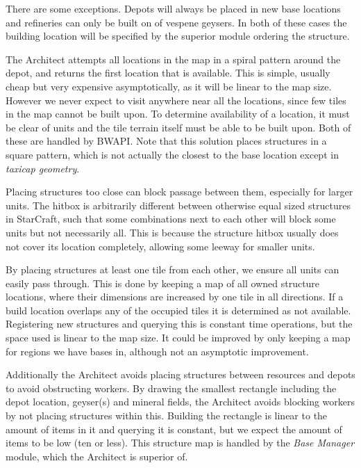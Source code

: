 	There are some exceptions. Depots will always be placed in new base locations and refineries can only be built on of vespene geysers. In both of these cases the building location will be specified by the superior module ordering the structure.

	The Architect attempts all locations in the map in a spiral pattern around the depot, and returns the first location that is available. This is simple, usually cheap but very expensive asymptotically, as it will be linear to the map size. However we never expect to visit anywhere near all the locations, since few tiles in the map cannot be built upon. To determine availability of a location, it must be clear of units and the tile terrain itself must be able to be built upon. Both of these are handled by BWAPI. Note that this solution places structures in a square pattern, which is not actually the closest to the base location except in \emph{taxicap geometry}.

	Placing structures too close can block passage between them, especially for larger units. The hitbox is arbitrarily different between otherwise equal sized structures in StarCraft, such that some combinations next to each other will block some units but not necessarily all. This is because the structure hitbox usually does not cover its location completely, allowing some leeway for smaller units.
	
	By placing structures at least one tile from each other, we ensure all units can easily pass through. This is done by keeping a map of all owned structure locations, where their dimensions are increased by one tile in all directions. If a build location overlaps any of the occupied tiles it is determined as not available. Registering new structures and querying this is constant time operations, but the space used is linear to the map size. It could be improved by only keeping a map for regions we have bases in, although not an asymptotic improvement.
	
	Additionally the Architect avoids placing structures between resources and depots to avoid obstructing workers. By drawing the smallest rectangle including the depot location, geyser(s) and mineral fields, the Architect avoids blocking workers by not placing structures within this. Building the rectangle is linear to the amount of items in it and querying it is constant, but we expect the amount of items to be low (ten or less). This structure map is handled by the \emph{Base Manager} module, which the Architect is superior of.
	
